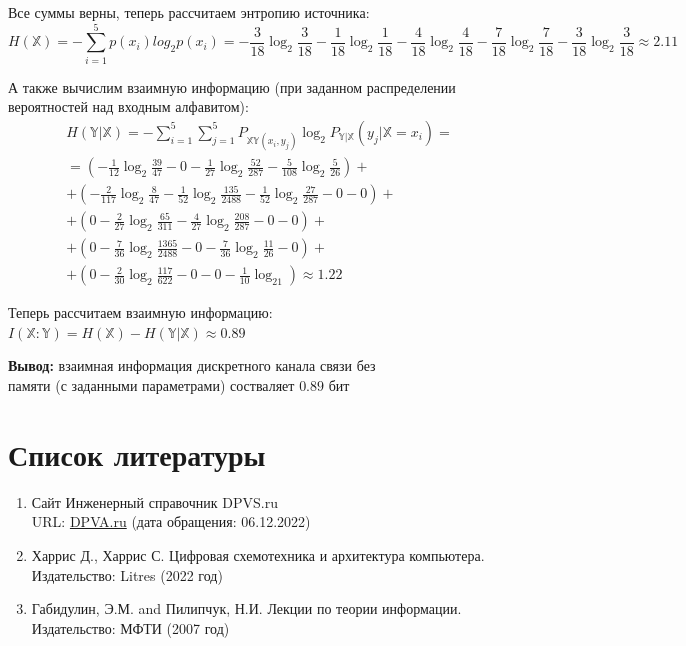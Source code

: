 \documentclass[a4paper,12pt]{article}
\begin{document}
  Все суммы верны, теперь рассчитаем энтропию источника:
  \begin{equation}
    H(\mathbb{X}) = -\sum\limits_{i = 1}^5 p(x_i)log_2p(x_i) =
    -\frac{3}{18}\log_2\frac{3}{18} - \frac{1}{18}\log_2\frac{1}{18} -
    \frac{4}{18}\log_2\frac{4}{18} - \frac{7}{18}\log_2\frac{7}{18} - 
    \frac{3}{18}\log_2\frac{3}{18} \approx 2.11
  \end{equation}

  А также вычислим взаимную информацию (при заданном распределении вероятностей
  над входным алфавитом):
  \begin{multline}
    H(\mathbb{Y}|\mathbb{X}) = -\sum\limits_{i = 1}^5\sum\limits_{j = 1}^5P_{\mathbb{XY}(x_i, y_j)}
    \log_2P_{\mathbb{Y}|\mathbb{X}}(y_j|\mathbb{X} = x_i) = \\
    = (-\frac{1}{12}\log_2\frac{39}{47} - 0 - \frac{1}{27}\log_2\frac{52}{287}
    - \frac{5}{108}\log_2\frac{5}{26}) +\\
    +(-\frac{2}{117}\log_2\frac{8}{47} - \frac{1}{52}\log_2\frac{135}{2488} -
    \frac{1}{52}\log_2\frac{27}{287} - 0 - 0 ) +\\
    + ( 0 - \frac{2}{27}\log_2\frac{65}{311} - \frac{4}{27}\log_2\frac{208}{287} - 0 - 0 ) +\\
    + ( 0 - \frac{7}{36}\log_2\frac{1365}{2488} - 0 - \frac{7}{36}\log_2\frac{11}{26} - 0 ) +\\
    + ( 0 - \frac{2}{30}\log_2\frac{117}{622} - 0 - 0 -\frac{1}{10}\log_21 ) \approx 1.22
  \end{multline}

  Теперь рассчитаем взаимную информацию: $I(\mathbb{X}:\mathbb{Y}) = H(\mathbb{X}) - H (\mathbb{Y}|\mathbb{X}) \approx 0.89$

  \begin{flushright}
    \textbf{Вывод:} взаимная информация дискретного канала связи без \\
    памяти (с заданными параметрами) состваляет $0.89$ бит
  \end{flushright}

  \pagebreak
  \section*{Список литературы}

  \begin{enumerate}
    \item {
        Сайт Инженерный справочник DPVS.ru \\
        URL: \href{https://dpva.ru/Guide/GuideUnitsAlphabets/Alphabets/FrequencyRuLetters/}{DPVA.ru}
        (дата обращения: 06.12.2022)
    }
    \item {
      Харрис Д., Харрис С. Цифровая схемотехника и архитектура компьютера. \\
      Издательство: Litres (2022 год)
    }
    \item {
      Габидулин, Э.М. and Пилипчук, Н.И. Лекции по теории информации. \\
      Издательство: МФТИ (2007 год)
    }
  \end{enumerate}
\end{document}
